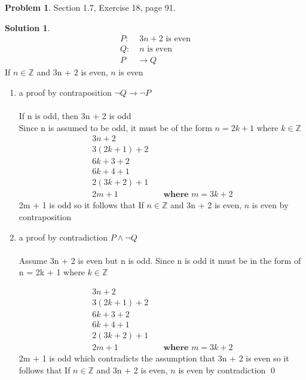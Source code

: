 \documentclass{article}
\theoremstyle{definition}
\newtheorem{problem}{Problem}
\newtheorem*{solution}{Solution}
\begin{document}
\begin{problem} Section 1.7, Exercise 18, page 91.
\end{problem}
\begin{solution} \ \\
\begin{align*}
  P:&\; 3n + 2 \text{ is even} \\
  Q:& \; n \text{ is even} \\
  P &\rightarrow Q
\end{align*}
If $n \in \mathbb{Z}$ and  3n + 2 is even, $n$ is even
\begin{enumerate}
  \item a proof by contraposition $\lnot Q \rightarrow \lnot P$ \\ \ \\
  If n is odd, then 3n + 2 is odd \\
  Since n is assumed to be odd, it must be of the form $n = 2k + 1$ where $k \in \mathbb{Z}$
  \begin{align*}
    3n + 2 \\
    3(2k + 1) + 2 \\
    6k + 3 + 2 \\
    6k + 4 + 1 \\
    2(3k + 2) + 1 \\
    2m + 1& \quad \textbf{where $m = 3k + 2$}
  \end{align*}
  2m + 1 is odd so it follows that If $n \in \mathbb{Z}$ and  3n + 2 is even, $n$ is even by contraposition

  \item a proof by contradiction $P \land \lnot Q$ \\ \ \\
  Assume 3n + 2 is even but n is odd. Since n is odd it must be in the form of n = 2k + 1 where $k \in \mathbb{Z}$

    \begin{align*}
    3n + 2 \\
    3(2k + 1) + 2 \\
    6k + 3 + 2 \\
    6k + 4 + 1 \\
    2(3k + 2) + 1 \\
    2m + 1& \quad \textbf{where $m = 3k + 2$}
  \end{align*}
  2m + 1 is odd which contradicts the assumption that 3n + 2 is even so it follows that If $n \in \mathbb{Z}$ and  3n + 2 is even, $n$ is even by contradiction \qed  
\end{enumerate}
\end{solution}
\end{document}
